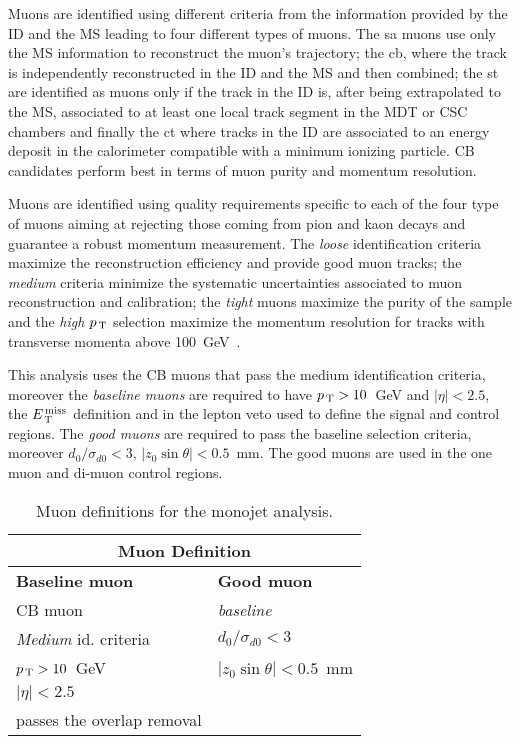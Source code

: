 Muons are identified using different criteria from the information provided by
the ID and the MS leading to four different types of muons. The \gls{sa} muons
use only the MS information to reconstruct the muon's trajectory; the \gls{cb},
where the track is independently reconstructed in the ID and the MS and then
combined; the \gls{st} are identified as muons only if the track in the ID is,
after being extrapolated to the MS, associated to at least one local track
segment in the MDT or CSC chambers and finally the \gls{ct} where tracks in the
ID are associated to an energy deposit in the calorimeter compatible with a
minimum ionizing particle. CB candidates perform best in terms of muon purity
and momentum resolution.

Muons are identified using quality requirements specific to each of the four
type of muons aiming at rejecting those coming from pion and kaon decays and
guarantee a robust momentum measurement. The \emph{loose} identification
criteria maximize the reconstruction efficiency and provide good muon tracks;
the \emph{medium} criteria minimize the systematic uncertainties associated to
muon reconstruction and calibration; the \emph{tight} muons maximize the purity
of the sample and the \emph{high $p_\mathrm{\, T}$} selection maximize the momentum
resolution for tracks with transverse momenta above 100~GeV~\cite{MUONS}.

This analysis uses the CB muons that pass the medium identification criteria,
moreover the \emph{baseline muons} are required to have $p_\mathrm{\, T} > 10$~GeV and
$|\eta| < 2.5$, the $E_\mathrm{\, T}^\mathrm{\, miss}$ definition and in the lepton veto used to define the
signal and control regions. The \emph{good muons} are required to pass the
baseline selection criteria, moreover $d_0 / \sigma_{d0} < 3$,
$|z_0 \sin \theta| < 0.5$~mm. The good muons are used in the one muon and
di-muon control regions.

\begin{table}[!th]
  \centering
  \begin{tabular}{ll}
    \toprule
    \multicolumn{2}{c}{Muon Definition} \\
    \midrule \midrule
    \textbf{Baseline muon} & \textbf{Good muon} \\
    \midrule
    CB muon & \emph{baseline} \\
    \emph{Medium} id. criteria & $d_0 / \sigma_{d0} < 3$ \\
    $p_\mathrm{\, T} > 10$~GeV & $|z_0 \sin \theta| < 0.5$~mm \\
    $|\eta| < 2.5$ & \\
    passes the overlap removal & \\
    \bottomrule
  \end{tabular}
  \caption{Muon definitions for the monojet analysis.}
  \label{tab:mu_def}
\end{table}
